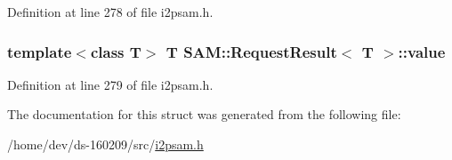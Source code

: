 Definition at line 278 of file i2psam.\+h.

\hypertarget{struct_s_a_m_1_1_request_result_a8253483e546b2075a1dda00ef1fb310a}{}
\subsubsection[{value}]{\setlength{\rightskip}{0pt plus 5cm}template$<$class T$>$ T {\bf S\+A\+M\+::\+Request\+Result}$<$ T $>$\+::value}\label{struct_s_a_m_1_1_request_result_a8253483e546b2075a1dda00ef1fb310a}


Definition at line 279 of file i2psam.\+h.



The documentation for this struct was generated from the following file\+:\begin{DoxyCompactItemize}
\item 
/home/dev/ds-\/160209/src/\hyperlink{i2psam_8h}{i2psam.\+h}\end{DoxyCompactItemize}
